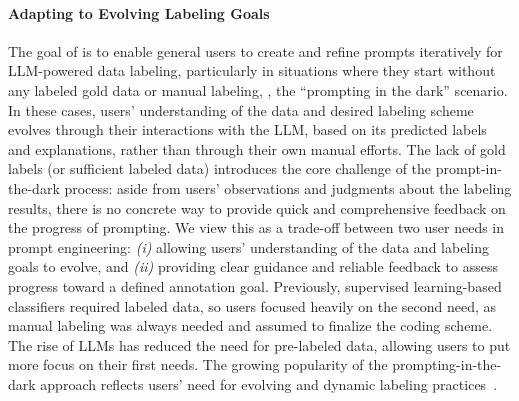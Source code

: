 
\paragraph{Adapting to Evolving Labeling Goals}
The goal of \system is to enable general users to create and refine prompts iteratively for LLM-powered data labeling, particularly in situations where they start without any labeled gold data or manual labeling, \ie, the ``prompting in the dark'' scenario. 
In these cases, users' understanding of the data and desired labeling scheme evolves through their interactions with the LLM, based on its predicted labels and explanations, rather than through their own manual efforts. 
The lack of gold labels (or sufficient labeled data) introduces the core challenge of the prompt-in-the-dark process: aside from users' observations and judgments about the labeling results, there is no concrete way to provide quick and comprehensive feedback on the progress of prompting.
We view this as a trade-off between two user needs in prompt engineering: 
{\em (i)} allowing users' understanding of the data and labeling goals to evolve, and 
{\em (ii)} providing clear guidance and reliable feedback to assess progress toward a defined annotation goal. 
Previously, supervised learning-based classifiers required labeled data, so users focused heavily on the second need, as manual labeling was always needed and assumed to finalize the coding scheme. 
The rise of LLMs has reduced the need for pre-labeled data, allowing users to put more focus on their first needs. 
The growing popularity of the prompting-in-the-dark approach reflects users' need for evolving and dynamic labeling practices~\cite{austin2024grad,zhang-etal-2024-glape,wang2024human}.
